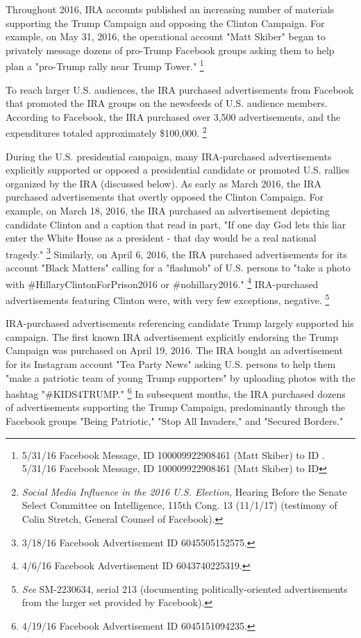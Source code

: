 Throughout 2016, IRA accounts published an increasing number of materials supporting the Trump Campaign and opposing the Clinton Campaign.
For example, on May 31, 2016, the operational account "Matt Skiber" began to privately message dozens of pro-Trump Facebook groups asking them to help plan a "pro-Trump rally near Trump Tower."%
\footnote{5/31/16 Facebook Message, ID 100009922908461 (Matt Skiber) to ID .
5/31/16 Facebook Message, ID 100009922908461 (Matt Skiber) to ID }

To reach larger U.S. audiences, the IRA purchased advertisements from Facebook that promoted the IRA groups on the newsfeeds of U.S. audience members.
According to Facebook, the IRA purchased over 3,500 advertisements, and the expenditures totaled approximately \$100,000.%
\footnote{\textit{Social Media Influence in the 2016 U.S. Election}, Hearing Before the Senate Select Committee on Intelligence, 115th Cong. 13 (11/1/17) (testimony of Colin Stretch, General Counsel of Facebook).}

During the U.S. presidential campaign, many IRA-purchased advertisements explicitly supported or opposed a  presidential candidate or promoted U.S. rallies organized by the IRA (discussed below).
As early as March 2016, the IRA purchased advertisements that overtly opposed the Clinton Campaign.
For example, on March 18, 2016, the IRA purchased an advertisement depicting candidate Clinton and a caption that read in part, "If one day God lets this liar enter the White House as a president - that day would be a  real national tragedy."%
\footnote{3/18/16 Facebook Advertisement ID 6045505152575.}
Similarly, on April 6, 2016, the IRA purchased advertisements for its account "Black Matters" calling for a  "flashmob" of U.S. persons to "take a photo with \#HillaryClintonForPrison2016 or \#nohillary2016."%
\footnote{4/6/16 Facebook Advertisement ID 6043740225319.}
IRA-purchased advertisements featuring Clinton were, with very few exceptions, negative.%
\footnote{\textit{See} SM-2230634, serial 213 (documenting politically-oriented advertisements from the larger set provided by Facebook).}

IRA-purchased advertisements referencing candidate Trump largely supported his campaign.
The first known IRA advertisement explicitly endorsing the Trump Campaign was purchased on April 19, 2016.
The IRA bought an advertisement for its Instagram account "Tea Party News" asking U.S. persons to help them "make a patriotic team of young Trump supporters" by uploading photos with the hashtag "\#KIDS4TRUMP."%
\footnote{4/19/16 Facebook Advertisement ID 6045151094235.}
In subsequent months, the IRA purchased dozens of advertisements supporting the Trump Campaign, predominantly through the Facebook groups "Being Patriotic," "Stop All Invaders," and "Secured Borders."

